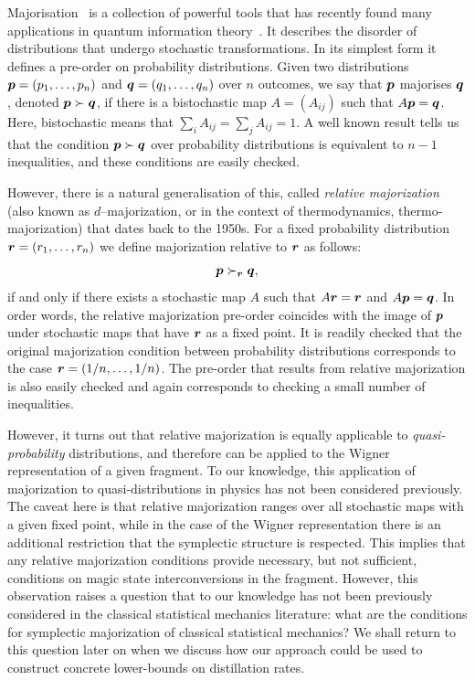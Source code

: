 \documentclass[pra,
aps,
twocolumn,
superscriptaddress,
groupedaddress,
nofootinbib,
reprint
]{revtex4-1}
\begin{document}
Majorisation~\cite{cit:marshall} is a collection of powerful tools that has recently found many applications in quantum information theory~\cite{Nielsen_1999, cit:cwiklinski, cit:lostaglio2, cit:gour, cit:gour2, Horodecki_2003, Vallejos_2021}.
It describes the disorder of distributions that undergo stochastic transformations. In its simplest form it defines a pre-order on probability distributions. Given two distributions $\boldsymbol{p}= (p_1, \dots, p_n)$ and $\boldsymbol{q} = (q_1, \dots, q_n)$ over $n$ outcomes, we say that $\boldsymbol{p}$ majorises $\boldsymbol{q}$, denoted $\boldsymbol{p} \succ \boldsymbol{q}$, if there is a bistochastic map $A=(A_{ij})$ such that $A\boldsymbol{p} = \boldsymbol{q}$. Here, bistochastic means that $\sum_i A_{ij} = \sum_j A_{ij} = 1$. A well known result tells us that the condition $ \boldsymbol{p} \succ \boldsymbol{q}$ over probability distributions is equivalent to $n-1$ inequalities, and these conditions are easily checked.

However, there is a natural generalisation of this, called \emph{relative majorization} (also known as $d$--majorization, or in the context of thermodynamics, thermo-majorization) that dates back to the 1950s. For a fixed probability distribution $\boldsymbol{r} = (r_1, \dots, r_n)$ we define majorization relative to $\boldsymbol{r}$ as follows:
\begin{equation}
\boldsymbol{p} \succ_{\boldsymbol{r}} \boldsymbol{q},
\end{equation}
if and only if there exists a stochastic map $A$ such that $A\boldsymbol{r} = \boldsymbol{r}$ and $A \boldsymbol{p} = \boldsymbol{q}$. In order words, the relative majorization pre-order coincides with the image of $\boldsymbol{p}$ under stochastic maps that have $\boldsymbol{r}$ as a fixed point. It is readily checked that the original majorization condition between probability distributions corresponds to the case $\boldsymbol{r} = (1/n, \dots, 1/n)$. The pre-order that results from relative majorization is also easily checked and again corresponds to checking a small number of inequalities.

However, it turns out that relative majorization is equally applicable to \emph{quasi-probability} distributions, and therefore can be applied to the Wigner representation of a given fragment. To our knowledge, this application of majorization to quasi-distributions in  physics has not been considered previously. The caveat here is that relative majorization ranges over all stochastic maps with a given fixed point, while in the case of the Wigner representation there is an additional restriction that the symplectic structure is respected. This implies that any relative majorization conditions provide necessary, but not sufficient, conditions on magic state interconversions in the fragment. However, this observation raises a question that to our knowledge has not been previously considered in the classical statistical mechanics literature: what are the conditions for symplectic majorization of classical statistical mechanics? We shall return to this question later on when we discuss how our approach could be used to construct concrete lower-bounds on distillation rates.
\end{document}
